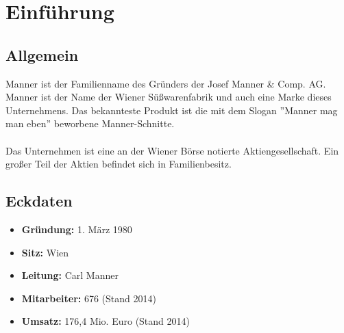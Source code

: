 \section{Einführung}
\subsection{Allgemein}
Manner ist der Familienname des Gründers der Josef Manner \& Comp. AG. Manner ist der Name der Wiener Süßwarenfabrik und auch eine Marke dieses Unternehmens. Das bekannteste Produkt ist die mit dem Slogan ''Manner mag man eben'' beworbene Manner-Schnitte. \cite{wiki_manner} \\\\
\noindent
Das Unternehmen ist eine an der Wiener Börse notierte Aktiengesellschaft. Ein großer Teil der Aktien befindet sich in Familienbesitz. \cite{wiki_manner}
\subsection{Eckdaten}
\begin{itemize}
\item \textbf{Gründung: } 1. März 1980
\item \textbf{Sitz: } Wien
\item \textbf{Leitung: } Carl Manner
\item \textbf{Mitarbeiter: } 676 (Stand 2014)
\item \textbf{Umsatz: } 176,4 Mio. Euro (Stand 2014) 
\end{itemize}
\cite{wiki_manner}